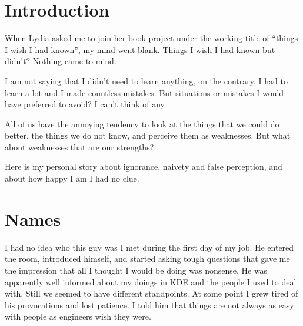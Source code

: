 ﻿


\section*{Introduction}

When Lydia asked me to join her book project under the working title of ``things
I wish I had known'', my mind went blank. Things I wish I had known but didn't?
Nothing came to mind.

I am not saying that I didn't need to learn anything, on the contrary. I had to
learn a lot and I made countless mistakes. But situations or mistakes I would
have preferred to avoid? I can't think of any.

All of us have the annoying tendency to look at the things that we could do
better, the things we do not know, and perceive them as weaknesses. But what
about weaknesses that are our strengths?

Here is my personal story about ignorance, naivety and false perception, and
about how happy I am I had no clue.

\section*{Names}

I had no idea who this guy was I met during the first day of my job. He entered
the room, introduced himself, and started asking tough questions that gave me
the impression that all I thought I would be doing was nonsense. He was
apparently well informed about my doings in KDE and the people I used to deal
with. Still we seemed to have different standpoints. At some point I grew tired
of his provocations and lost patience. I told him that things are not always as
easy with people as engineers wish they were.

